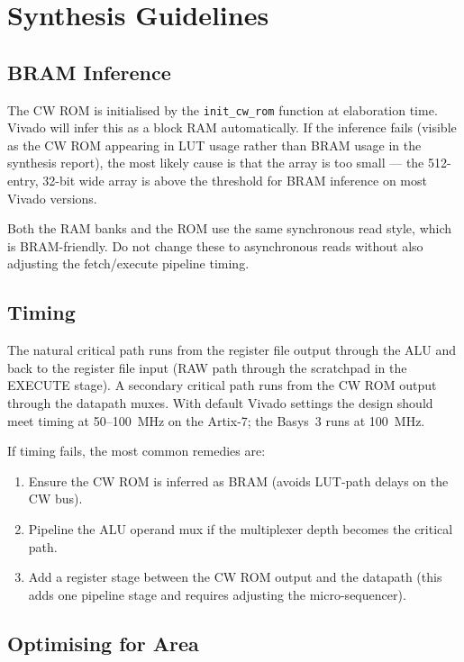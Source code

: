 \documentclass[a4paper,12pt]{report}
\newcommand{\asm}[1]{\texttt{#1}}
\begin{document}
\section{Synthesis Guidelines}

\subsection{BRAM Inference}

The CW ROM is initialised by the \asm{init\_cw\_rom} function at elaboration time. Vivado will infer this as a block RAM automatically. If the inference fails (visible as the CW ROM appearing in LUT usage rather than BRAM usage in the synthesis report), the most likely cause is that the array is too small --- the 512-entry, 32-bit wide array is above the threshold for BRAM inference on most Vivado versions.

Both the RAM banks and the ROM use the same synchronous read style, which is BRAM-friendly. Do not change these to asynchronous reads without also adjusting the fetch/execute pipeline timing.

\subsection{Timing}

The natural critical path runs from the register file output through the ALU and back to the register file input (RAW path through the scratchpad in the EXECUTE stage). A secondary critical path runs from the CW ROM output through the datapath muxes. With default Vivado settings the design should meet timing at \mbox{50--100~MHz} on the Artix-7; the Basys~3 runs at 100~MHz.

If timing fails, the most common remedies are:

\begin{enumerate}
    \item Ensure the CW ROM is inferred as BRAM (avoids LUT-path delays on the CW bus).
    \item Pipeline the ALU operand mux if the multiplexer depth becomes the critical path.
    \item Add a register stage between the CW ROM output and the datapath (this adds one pipeline stage and requires adjusting the micro-sequencer).
\end{enumerate}

\subsection{Optimising for Area}
\end{document}
